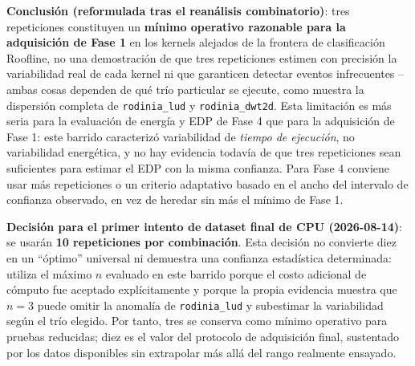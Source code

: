 \textbf{Conclusión (reformulada tras el reanálisis combinatorio)}: tres
repeticiones constituyen un \textbf{mínimo operativo razonable para la
adquisición de Fase 1} en los kernels alejados de la frontera de
clasificación Roofline, no una demostración de que tres repeticiones
estimen con precisión la variabilidad real de cada kernel ni que
garanticen detectar eventos infrecuentes -- ambas cosas dependen de qué
trío particular se ejecute, como muestra la dispersión completa de
\texttt{rodinia\_lud} y \texttt{rodinia\_dwt2d}. Esta limitación es más
seria para la evaluación de energía y EDP de Fase 4 que para la
adquisición de Fase 1: este barrido caracterizó variabilidad de
\emph{tiempo de ejecución}, no variabilidad energética, y no hay evidencia
todavía de que tres repeticiones sean suficientes para estimar el EDP con
la misma confianza. Para Fase 4 conviene usar más repeticiones o un
criterio adaptativo basado en el ancho del intervalo de confianza
observado, en vez de heredar sin más el mínimo de Fase 1.

\textbf{Decisión para el primer intento de dataset final de CPU
(2026-08-14)}: se usarán \textbf{10 repeticiones por combinación}. Esta
decisión no convierte diez en un ``óptimo'' universal ni demuestra una
confianza estadística determinada: utiliza el máximo $n$ evaluado en este
barrido porque el costo adicional de cómputo fue aceptado explícitamente y
porque la propia evidencia muestra que $n=3$ puede omitir la anomalía de
\texttt{rodinia\_lud} y subestimar la variabilidad según el trío elegido.
Por tanto, tres se conserva como mínimo operativo para pruebas reducidas;
diez es el valor del protocolo de adquisición final, sustentado por los
datos disponibles sin extrapolar más allá del rango realmente ensayado.




